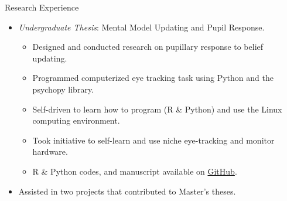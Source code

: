 \documentclass{resume} %
\begin{document}
\begin{rSection}{Research Experience}
    \begin{itemize}[nosep]
        
        \item \emph{Undergraduate Thesis}: 
        Mental Model Updating and Pupil Response.
            \begin{itemize}
                \item Designed and conducted research on pupillary response to 
                belief updating.
                \item Programmed computerized eye tracking task using Python and the psychopy library.
                \item Self-driven to learn how to program (R \& Python) and use the Linux computing environment.
                \item Took initiative to self-learn and use niche eye-tracking and monitor hardware.
                \item R \& Python codes, and manuscript available on \href{https://github.com/sjp117/Undergrad_Projects/tree/master/mentalModelUpdatingPupil}{GitHub}.
            \end{itemize}
        \item Assisted in two projects that contributed to Master's theses.
        
    \end{itemize}
    
\end{rSection}


\end{document}
